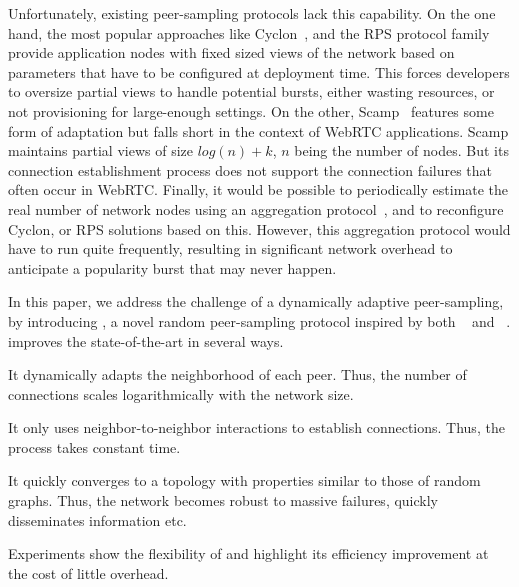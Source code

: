 Unfortunately, existing peer-sampling protocols
lack this
capability. On the one hand, the most popular approaches like
Cyclon~\cite{voulgaris2005cyclon}, and the RPS protocol
family~\cite{jelasity2007gossip} provide application nodes with fixed
sized views of the network based on parameters that have to be
configured at deployment time. This forces developers to oversize
partial views to handle potential bursts, either wasting resources, or
not provisioning for large-enough settings. On the other,
Scamp~\cite{ganesh2003peer} features some form of adaptation but falls
short in the context of WebRTC applications. Scamp maintains partial
views of size $log(n)+k$, $n$ being the number of nodes. But its
connection establishment process does not support the connection
failures that often occur in WebRTC. 
Finally, it would be possible to periodically estimate the real number
of network nodes using an aggregation
protocol~\cite{montresor2004robust}, and to reconfigure Cyclon, or RPS
solutions based on this. However, this aggregation protocol would have
to run quite frequently, resulting in significant network overhead
to anticipate a popularity burst that may never happen. 


In this paper, we address the challenge of a dynamically adaptive
peer-sampling, by introducing \SPRAY, a novel random peer-sampling
protocol inspired by both \SCAMP~\cite{ganesh2003peer} and
\CYCLON~\cite{voulgaris2005cyclon}. \SPRAY improves the
state-of-the-art in several ways.
\begin{inparaenum}[(i)]
\item It dynamically adapts the neighborhood of each peer. Thus, the
  number of connections scales logarithmically with the network size.
\item It only uses neighbor-to-neighbor interactions to establish
  connections. Thus, the process takes constant time.
\item It quickly converges to a topology with properties similar to
  those of random graphs. Thus, the network becomes robust to massive
  failures, quickly disseminates information etc.
\item Experiments show the flexibility of \SPRAY and highlight its
  efficiency improvement at the cost of little overhead.
\end{inparaenum}


